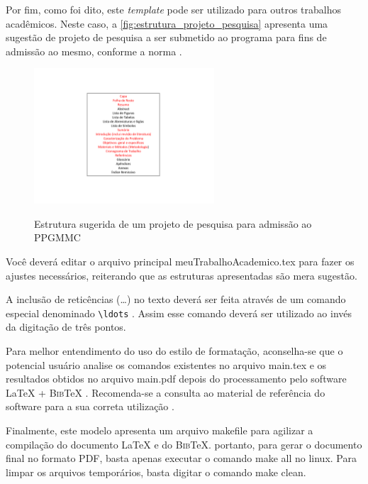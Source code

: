 \begin{apendicesenv}
Por fim, como foi dito, este  \emph{template} pode ser utilizado para outros trabalhos acadêmicos. Neste caso, a \autoref{fig:estrutura_projeto_pesquisa} apresenta uma sugestão de projeto de pesquisa a ser submetido ao programa para fins de admissão ao mesmo, conforme a norma .

\begin{figure}[!htb]
    \centering
    \caption{Estrutura sugerida de um projeto de pesquisa para admissão ao PPGMMC}
    \includegraphics[width=0.6\textwidth]{./04-figuras/estrutura-projeto-pesquisa}
    \label{fig:estrutura_projeto_pesquisa}
\end{figure}

Você deverá editar o arquivo principal {\ttfamily meuTrabalhoAcademico.tex} para fazer os ajustes necessários, reiterando que as estruturas apresentadas são mera sugestão.

A inclusão de reticências (\ldots) no texto deverá ser feita através de um comando especial denominado \verb|\ldots| \cite{LaTeX2014}. Assim esse comando deverá ser utilizado ao invés da digitação de três pontos.

Para melhor entendimento do uso do estilo de formatação, aconselha-se que o potencial usuário analise os comandos existentes no arquivo {\ttfamily main.tex} e os resultados obtidos no arquivo {\ttfamily main.pdf} depois do processamento pelo software \LaTeX{} + \textsc{Bib}\TeX{} \cite{LaTeX2014,BibTeX2014}.
Recomenda-se a consulta ao material de referência do software para a sua correta utilização \cite{Lamport1986,Buerger1989,Kopka2003,Mittelbach2004}.

Finalmente, este modelo apresenta um arquivo {\ttfamily makefile} para agilizar a compilação do documento \LaTeX{} e do \textsc{Bib}\TeX{}. portanto, para gerar o documento final no formato PDF, basta apenas executar o comando {\ttfamily make all} no linux. Para limpar os arquivos temporários, basta digitar o comando {\ttfamily make clean}.


\end{apendicesenv}
